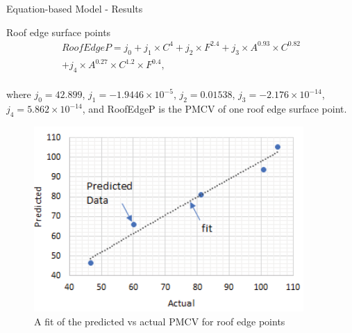 \documentclass{beamer}
\begin{document}
\begin{frame}{Equation-based Model - Results}
    \begin{block}{Roof edge surface points}
        \;\vspace{-5mm}\begin{multline}
            RoofEdgeP = j_0 + j_1 \times C^4 + j_2 \times F^{2.4} + j_3 \times A^{0.93} \times C^{0.82}\\ + j_4 \times A^{0.27} \times C^{1.2} \times F^{0.4},
        \end{multline}\\\vspace{-3mm}\justifying
        where $j_0 = 42.899$, $j_1=-1.9446 \times 10^{-5}$, $j_2 = 0.01538$, $j_3 = -2.176 \times 10^{-14}$, $j_4 = 5.862 \times 10^{-14}$, and RoofEdgeP is the PMCV of one roof edge surface point.\vspace{-2mm}
        \begin{figure}
            \centering
            \includegraphics[width=0.3\columnwidth]{Figures/Eq-RE.png}\vspace{-1mm}
            \caption{A fit of the predicted vs actual PMCV for roof edge points}
        \end{figure}\vspace{-6.5mm}
    \end{block}
\end{frame}
\end{document}
